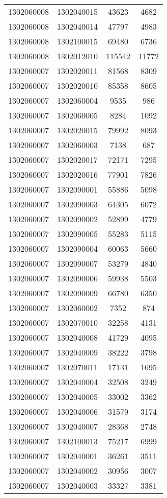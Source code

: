 \begin{longtable}{llcc}
1302060008 & 1302040015 & 43623 & 4682\\
1302060008 & 1302040014 & 47797 & 4983\\
1302060008 & 1302100015 & 69480 & 6736\\
1302060008 & 1302012010 & 115542 & 11772\\
1302060007 & 1302020011 & 81568 & 8309\\
1302060007 & 1302020010 & 85358 & 8605\\
1302060007 & 1302060004 & 9535 & 986\\
1302060007 & 1302060005 & 8284 & 1092\\
1302060007 & 1302020015 & 79992 & 8093\\
1302060007 & 1302060003 & 7138 & 687\\
1302060007 & 1302020017 & 72171 & 7295\\
1302060007 & 1302020016 & 77901 & 7826\\
1302060007 & 1302090001 & 55886 & 5098\\
1302060007 & 1302090003 & 64305 & 6072\\
1302060007 & 1302090002 & 52899 & 4779\\
1302060007 & 1302090005 & 55283 & 5115\\
1302060007 & 1302090004 & 60063 & 5660\\
1302060007 & 1302090007 & 53279 & 4840\\
1302060007 & 1302090006 & 59938 & 5503\\
1302060007 & 1302090009 & 66780 & 6350\\
1302060007 & 1302060002 & 7352 & 874\\
1302060007 & 1302070010 & 32258 & 4131\\
1302060007 & 1302040008 & 41729 & 4095\\
1302060007 & 1302040009 & 38222 & 3798\\
1302060007 & 1302070011 & 17131 & 1695\\
1302060007 & 1302040004 & 32508 & 3249\\
1302060007 & 1302040005 & 33002 & 3362\\
1302060007 & 1302040006 & 31579 & 3174\\
1302060007 & 1302040007 & 28368 & 2748\\
1302060007 & 1302100013 & 75217 & 6999\\
1302060007 & 1302040001 & 36261 & 3511\\
1302060007 & 1302040002 & 30956 & 3007\\
1302060007 & 1302040003 & 33327 & 3381\\

\end{longtable}
